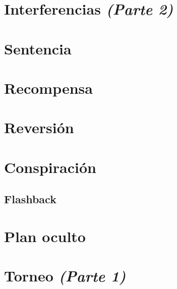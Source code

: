 \documentclass[11pt]{book}
\begin{document}
\chapter{Interferencias \emph{\mdseries(Parte 2)}}


\chapter{Sentencia}


\chapter{Recompensa}


\chapter{Reversión}


\chapter{Conspiración}


\begin{appendices}
\renewcommand{\thechapter}{\arabic{chapter}}
\chapter{Flashback}

\end{appendices}

\chapter{Plan oculto}


\chapter{Torneo \emph{\mdseries(Parte 1)}}

\end{document}
